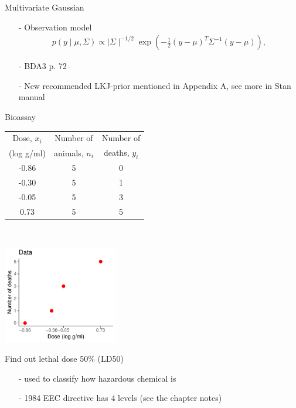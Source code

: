 \documentclass[10pt,handout]{beamer}
\begin{document}
\begin{frame}{Multivariate Gaussian}

  \begin{itemize}
  \item[-] Observation model
    \begin{align*}
      p(y \mid \mu,\Sigma)\propto  \mid \Sigma \mid ^{-1/2}
      \exp\left( -\frac{1}{2} (y-\mu)^T \Sigma^{-1} (y-\mu)\right),
    \end{align*}
  \item[-] BDA3 p. 72--
  \item[-] New recommended LKJ-prior mentioned in Appendix A, see more
    in Stan manual
  \end{itemize}
\end{frame}

\begin{frame}{Bioassay}

{\footnotesize\vspace{-1mm}
    \begin{tabular}{c c c}
      \vspace{-1mm} Dose, $x_i$ & Number of & Number of \\
      (log g/ml) & animals, $n_i$ & deaths, $y_i$ \\
      \hline \vspace{-1mm}
      -0.86 & 5 & \color{red} 0 \\ \vspace{-1mm}
      -0.30 & 5 & \color{red} 1 \\ \vspace{-1mm}
      -0.05 & 5 & \color{red} 3 \\ \vspace{-1mm}
       0.73 & 5 & \color{red} 5
    \end{tabular}
  }~\parbox[t][3cm][b]{3.5cm}{\includegraphics[width=5cm]{figs/bioassay_data_small.pdf}}
  \vspace{2mm}
  \pause

  \vspace{-\baselineskip}
  Find out lethal dose 50\% (LD50)
    \begin{itemize}
      \item[-] used to classify how hazardous chemical is
      \item[-] 1984 EEC directive has 4 levels (see the chapter notes)
      \end{itemize}


\end{frame}
\end{document}
